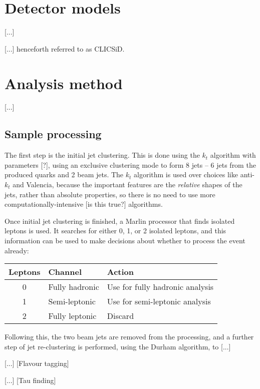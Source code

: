 \section{Detector models}
[...]

[...] henceforth referred to as CLIC\textunderscore SiD.

\section{Analysis method}
[...]

\subsection{Sample processing}

The first step is the initial jet clustering. This is done using the $k_t$ algorithm with parameters [?], using an exclusive clustering mode to form 8 jets -- 6 jets from the produced quarks and 2 beam jets. The $k_t$ algorithm is used over choices like anti-$k_t$ and Valencia, because the important features are the \emph{relative} shapes of the jets, rather than absolute properties, so there is no need to use more computationally-intensive [is this true?] algorithms.

Once initial jet clustering is finished, a Marlin processor that finds isolated leptons is used. It searches for either 0, 1, or 2 isolated leptons, and this information can be used to make decisions about whether to process the event already:

\begin{table}[htp]
\centering
	\begin{tabular}{ | c | l | l | }
	\hline
	Leptons & Channel & Action \\ \hline
	0 & Fully hadronic & Use for fully hadronic analysis \\ \hline
	1 & Semi-leptonic & Use for semi-leptonic analysis \\ \hline
	2 & Fully leptonic & Discard \\ \hline
	\end{tabular}
\end{table}

Following this, the two beam jets are removed from the processing, and a further step of jet re-clustering is performed, using the Durham algorithm, to [...] %

[...] [Flavour tagging]

[...] [Tau finding]

